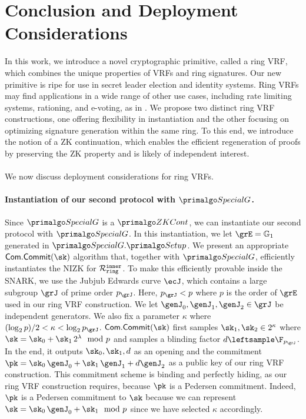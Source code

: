 
\section{Conclusion and Deployment Considerations}
\label{sec:conclusion}

In this work, we introduce a novel cryptographic primitive, called a ring VRF, which combines the unique properties of VRFs  and ring signatures. Our new primitive is ripe for use in secret leader election and identity systems.  Ring VRFs may find applications in a wide range of other use cases, including rate limiting systems, rationing, and e-voting, as in \cite{Semaphore}. We propose two distinct ring VRF constructions, one offering flexibility in instantiation and the other focusing on optimizing signature generation within the same ring. To this end, we introduce the notion of a ZK continuation, which enables the efficient regeneration of proofs by preserving the ZK property and is likely of independent interest.
\\\\
We now discuss deployment considerations for ring VRFs.

\paragraph{Instantiation of our second protocol with $ \SpecialG $.} Since $ \SpecialG $ is a $ \ZKCont $, we can instantiate our second protocol with $ \SpecialG$. In this instantiation, we let $ \GG = \grone $ generated in $ \SpecialG.\Setup $.  
We present an appropriate $ \mathsf{Com}.\mathsf{Commit}(\sk) $ algorithm that, together with $ \SpecialG $, efficiently instantiates the NIZK for $ \mathcal{R}_{\mathtt{ring}}^{\mathtt{inner}} $. To make this efficiently provable inside the SNARK,  we use the Jubjub Edwards curve $\ecJ$, which contains a large subgroup $\grJ$ of prime order $p_\grJ$. Here, $p_\grJ < p$ where $ p $ is the order of $\grE$ used in our ring VRF construction. We let $\genJ_0,\genJ_1,\genJ_2 \in \grJ$ be independent generators. We also fix a parameter $ \kappa $ where $(\log_2 p)/2 < \kappa < \log_2 p_\grJ$. $ \mathsf{Com}.\mathsf{Commit}(\sk) $ first samples $\sk_1,\sk_2 \in 2^\kappa$  where $\sk = \sk_0 + \sk_1 \, 2^{\lambda} \mod p$ and samples a blinding factor $d \leftsample \F_{p_\grJ} $. In the end, it outputs $ \sk_0, \sk_1,d $ as an opening and the commitment $\pk=\sk_0\, \genJ_0 + \sk_1\, \genJ_1 + d \genJ_2$ as a public key of our ring VRF construction. This commitment scheme is binding and perfectly hiding, as our ring VRF construction requires, because $ \pk $ is a Pedersen commitment. Indeed, $\pk$ is a Pedersen commitment to $\sk$ because we can represent $ \sk = \sk_0\, \genJ_0 + \sk_1 \mod p$ since we have selected $ \kappa $ accordingly.

